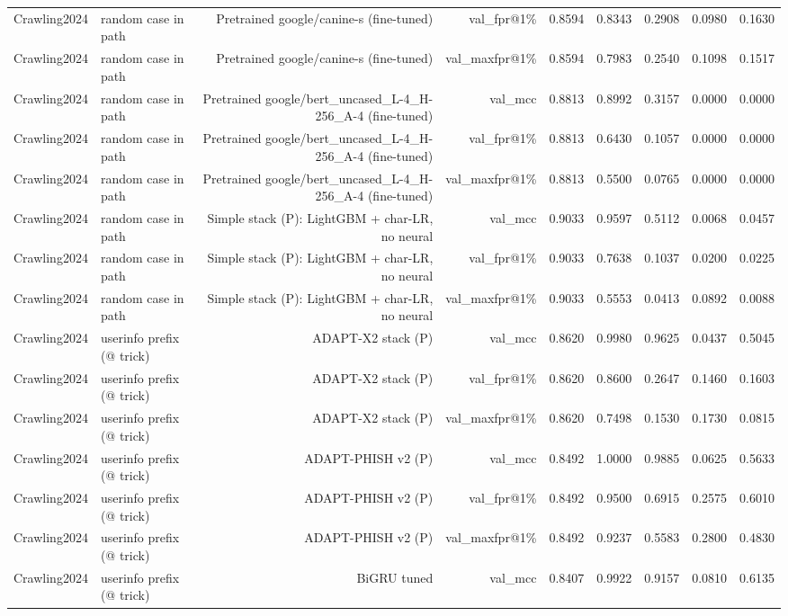 \begin{table}[t]
\begin{tabular}{llrrrrrrr}
Crawling2024 & random case in path & Pretrained google/canine-s (fine-tuned) & val\_fpr@1\% & 0.8594 & 0.8343 & 0.2908 & 0.0980 & 0.1630 \\
Crawling2024 & random case in path & Pretrained google/canine-s (fine-tuned) & val\_maxfpr@1\% & 0.8594 & 0.7983 & 0.2540 & 0.1098 & 0.1517 \\
Crawling2024 & random case in path & Pretrained google/bert\_uncased\_L-4\_H-256\_A-4 (fine-tuned) & val\_mcc & 0.8813 & 0.8992 & 0.3157 & 0.0000 & 0.0000 \\
Crawling2024 & random case in path & Pretrained google/bert\_uncased\_L-4\_H-256\_A-4 (fine-tuned) & val\_fpr@1\% & 0.8813 & 0.6430 & 0.1057 & 0.0000 & 0.0000 \\
Crawling2024 & random case in path & Pretrained google/bert\_uncased\_L-4\_H-256\_A-4 (fine-tuned) & val\_maxfpr@1\% & 0.8813 & 0.5500 & 0.0765 & 0.0000 & 0.0000 \\
Crawling2024 & random case in path & Simple stack (P): LightGBM + char-LR, no neural & val\_mcc & 0.9033 & 0.9597 & 0.5112 & 0.0068 & 0.0457 \\
Crawling2024 & random case in path & Simple stack (P): LightGBM + char-LR, no neural & val\_fpr@1\% & 0.9033 & 0.7638 & 0.1037 & 0.0200 & 0.0225 \\
Crawling2024 & random case in path & Simple stack (P): LightGBM + char-LR, no neural & val\_maxfpr@1\% & 0.9033 & 0.5553 & 0.0413 & 0.0892 & 0.0088 \\
Crawling2024 & userinfo prefix (@ trick) & ADAPT-X2 stack (P) & val\_mcc & 0.8620 & 0.9980 & 0.9625 & 0.0437 & 0.5045 \\
Crawling2024 & userinfo prefix (@ trick) & ADAPT-X2 stack (P) & val\_fpr@1\% & 0.8620 & 0.8600 & 0.2647 & 0.1460 & 0.1603 \\
Crawling2024 & userinfo prefix (@ trick) & ADAPT-X2 stack (P) & val\_maxfpr@1\% & 0.8620 & 0.7498 & 0.1530 & 0.1730 & 0.0815 \\
Crawling2024 & userinfo prefix (@ trick) & ADAPT-PHISH v2 (P) & val\_mcc & 0.8492 & 1.0000 & 0.9885 & 0.0625 & 0.5633 \\
Crawling2024 & userinfo prefix (@ trick) & ADAPT-PHISH v2 (P) & val\_fpr@1\% & 0.8492 & 0.9500 & 0.6915 & 0.2575 & 0.6010 \\
Crawling2024 & userinfo prefix (@ trick) & ADAPT-PHISH v2 (P) & val\_maxfpr@1\% & 0.8492 & 0.9237 & 0.5583 & 0.2800 & 0.4830 \\
Crawling2024 & userinfo prefix (@ trick) & BiGRU tuned & val\_mcc & 0.8407 & 0.9922 & 0.9157 & 0.0810 & 0.6135 \\

\end{tabular}
\end{table}
